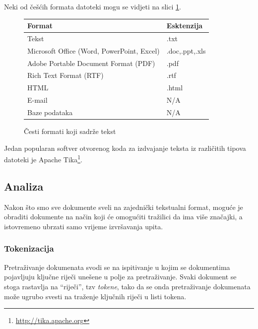 \documentclass[a4paper,twoside,12pt]{scrreprt}
\begin{document}
Neki od češćih formata datoteki mogu se vidjeti na slici \ref{formats}.

{\renewcommand{\arraystretch}{1.2}
\begin{figure}[H]
  \centering
  \begin{tabular}{|l|l|}
    \hline
    \textbf{Format}                            & \textbf{Esktenzija} \\
    \hline
    Tekst                                      & .txt                \\
    \hline
    Microsoft Office (Word, PowerPoint, Excel) & .doc,.ppt,.xls      \\
    \hline
    Adobe Portable Document Format (PDF)       & .pdf                \\
    \hline
    Rich Text Format (RTF)                     & .rtf                \\
    \hline
    HTML                                       & .html               \\
    \hline
    E-mail                                     & N/A                 \\
    \hline
    Baze podataka                              & N/A                 \\
    \hline
  \end{tabular}
  \caption{Česti formati koji sadrže tekst}
  \label{formats}
\end{figure}
}

Jedan popularan softver otvorenog koda za izdvajanje teksta iz različitih tipova datoteki je Apache Tika\footnote{\url{http://tika.apache.org}}.

\subsection{Analiza}

Nakon što smo sve dokumente sveli na zajednički tekstualni format, moguće je obraditi dokumente na način koji će omogućiti tražilici da ima više značajki, a istovremeno ubrzati samo vrijeme izvršavanja upita.

\subsubsection{Tokenizacija}

Pretraživanje dokumenata svodi se na ispitivanje u kojim se dokumentima pojavljuju ključne riječi unešene u polje za pretraživanje. Svaki dokument se stoga rastavlja na ``riječi'', tzv \textit{tokene}, tako da se onda pretraživanje dokumenata može ugrubo svesti na traženje ključnih riječi u listi tokena.
\end{document}
